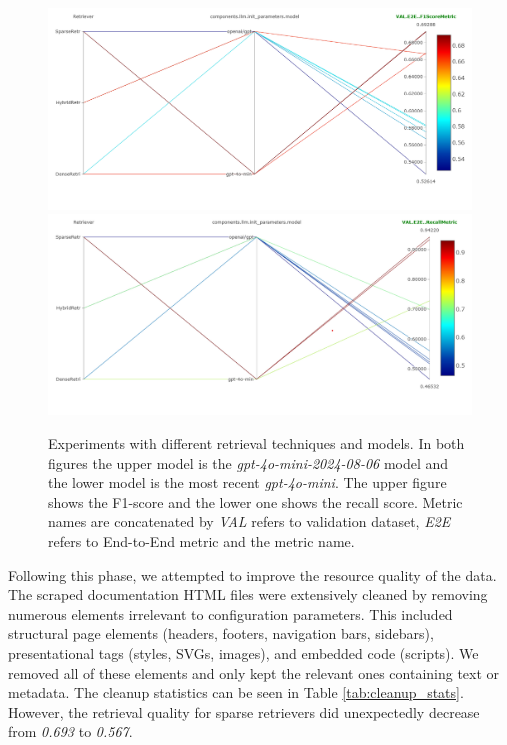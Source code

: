\begin{figure}[!ht]
    \centering
    \includegraphics[width=\textwidth]{images/RetrievalTypes-vs-LLM-f1.png}\\[6pt]
    \includegraphics[width=\textwidth]{images/RetrievalTypes-vs-LLM-Recall.png}
    \caption{Experiments with different retrieval techniques and models. In both figures the upper model is the \textit{gpt-4o-mini-2024-08-06} model and the lower model is the most recent \textit{gpt-4o-mini}. The upper figure shows the F1-score and the lower one shows the recall score. Metric names are concatenated by \textit{VAL} refers to validation dataset, \textit{E2E} refers to End-to-End metric and the metric name.}
    \label{fig:conf-phase-0-retrievers}
\end{figure}

Following this phase, we attempted to improve the resource quality of the data. The scraped documentation HTML files were extensively cleaned by removing numerous elements irrelevant to configuration parameters. This included structural page elements (headers, footers, navigation bars, sidebars), presentational tags (styles, SVGs, images), and embedded code (scripts). We removed all of these elements and only kept the relevant ones containing text or metadata. The cleanup statistics can be seen in Table \ref{tab:cleanup_stats}. However, the retrieval quality for sparse retrievers did unexpectedly decrease from \textit{0.693} to \textit{0.567}. 


